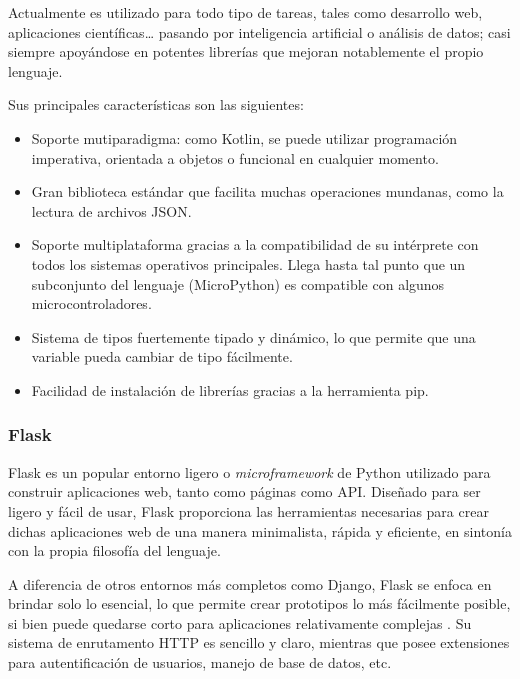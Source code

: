             Actualmente es utilizado para todo tipo de tareas, tales como desarrollo web, aplicaciones científicas… 
            pasando por inteligencia artificial o análisis de datos; casi siempre apoyándose en potentes librerías 
            que mejoran notablemente el propio lenguaje. \newline

            Sus principales características son las siguientes:
            \begin{itemize}
                \item Soporte mutiparadigma: como Kotlin, se puede utilizar programación imperativa, orientada a objetos o 
                funcional en cualquier momento.
                \item Gran biblioteca estándar que facilita muchas operaciones mundanas, como la lectura de archivos JSON.
                \item Soporte multiplataforma gracias a la compatibilidad de su intérprete con todos los sistemas 
                operativos principales. Llega hasta tal punto que un subconjunto del lenguaje (MicroPython) es compatible 
                con algunos microcontroladores.
                \item Sistema de tipos fuertemente tipado y dinámico, lo que permite que una variable pueda cambiar de 
                tipo fácilmente.
                \item Facilidad de instalación de librerías gracias a la herramienta pip.
            \end{itemize}
        
        \subsubsection{Flask}

            Flask es un popular entorno ligero o \textit{microframework} de Python utilizado para construir aplicaciones 
            web, tanto como páginas como API. Diseñado para ser ligero y fácil de usar, Flask proporciona las herramientas 
            necesarias para crear dichas aplicaciones web de una manera minimalista, rápida y eficiente, en sintonía con 
            la propia filosofía del lenguaje. \newline

            A diferencia de otros entornos más completos como Django, Flask se enfoca en brindar solo lo esencial, lo que 
            permite crear prototipos lo más fácilmente posible, si bien puede quedarse corto para aplicaciones 
            relativamente complejas \cite{rodriguez_flask_2014}. Su sistema de enrutamento HTTP es sencillo y claro, mientras que posee extensiones 
            para autentificación de usuarios, manejo de base de datos, etc. \newline

